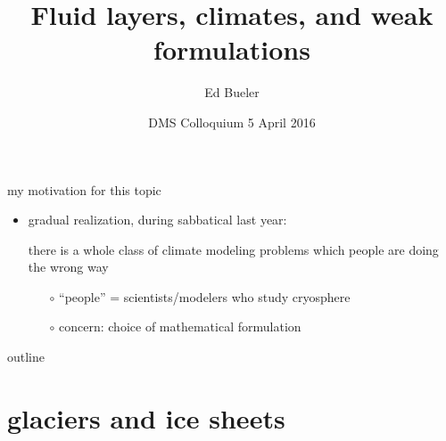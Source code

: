 \documentclass[xcolor={dvipsnames}]{beamer}
\title{Fluid layers, climates, and weak formulations}
\author{Ed Bueler}
\institute[UAF] %
{
  Dept of Mathematics and Statistics, and Geophysical Institute\\
  University of Alaska Fairbanks \\
  \tiny (\emph{funded by NASA Modeling, Analysis, and Prediction program})%
}
\date{DMS Colloquium 5 April 2016}
\begin{document}
\graphicspath{{../domains/}{../obstacle/}{../cartoon/}{../refinemass/}{../../images/}{../../../talks-public/commonfigs/}{../../../sia-fve/talks/}}

\begin{frame}
  \titlepage
\end{frame}


\begin{frame}{my motivation for this topic}
\begin{itemize}
\item gradual realization, during sabbatical last year:
\begin{center}
\alert{there is a whole class of climate modeling problems which people are doing the wrong way}
\end{center}
  \begin{itemize}
  \item[$\circ$] ``people'' = scientists/modelers who study cryosphere
  \item[$\circ$] concern: choice of mathematical formulation
  \end{itemize}
\end{itemize}

\end{frame}


\begin{frame}{outline}
  \tableofcontents
\end{frame}


\section{glaciers and ice sheets}
\end{document}
